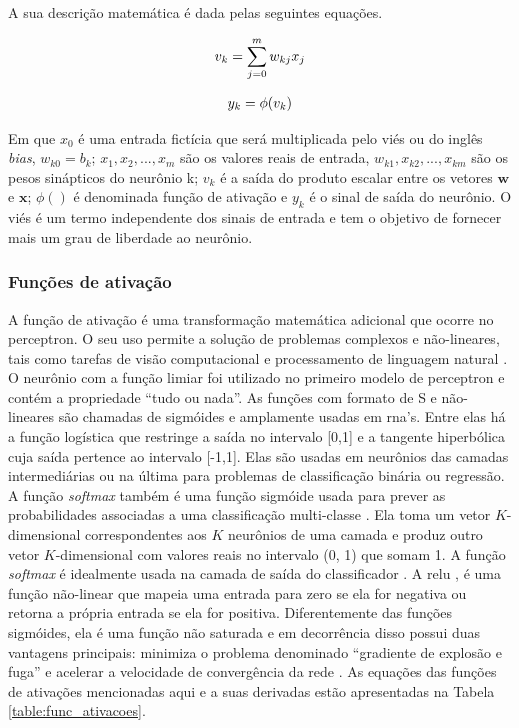 A sua descrição matemática é dada pelas seguintes equações.

\begin{equation}
\begin{aligned}
\centering    
v_{k} = \sum_{j=0}^{m}w_{kj}x_{j} 
\end{aligned}
\end{equation}


\begin{equation}
\begin{aligned}
\centering    
y_{k} = \phi(v_{k})
\end{aligned}
\end{equation}

Em que $x_{0}$ é uma entrada fictícia que será multiplicada pelo viés ou do inglês \textit{bias}, $w_{k0} = b_{k}$; $x_{1},x_{2}, ...,x_{m}$ são os valores reais de entrada, $w_{k1},x_{k2}, ...,x_{km}$ são os pesos sinápticos do neurônio k; $v_{k}$ é a saída do produto escalar entre os vetores $\textbf{w}$ e $ \textbf{x}$;  $\phi()$ é denominada função de ativação e $y_{k}$ é o sinal de saída do neurônio. O viés é um termo independente dos sinais de entrada e tem o objetivo de fornecer mais um grau de liberdade ao neurônio.

\subsubsection{Funções de ativação}
A função de ativação é uma transformação matemática adicional que ocorre no perceptron. O seu uso permite a solução de problemas complexos e não-lineares, tais como tarefas de visão computacional e processamento de linguagem natural \cite{Mitchell}. 
O neurônio com a função limiar foi utilizado no primeiro modelo de perceptron \cite{mcculloch1943logical,Haykin} e contém a propriedade ``tudo ou nada''.  As funções com formato de S e não-lineares são chamadas de sigmóides e amplamente usadas em \acrshort{rna}'s. Entre elas há a função logística que restringe a saída no intervalo [0,1] e a tangente hiperbólica cuja saída pertence ao intervalo [-1,1]. Elas são usadas em neurônios das camadas intermediárias ou na última para problemas de classificação binária ou regressão. 
A função \textit{softmax} também é uma função sigmóide usada para prever as probabilidades associadas a uma classificação multi-classe \cite{Goodfellow2016}.  Ela toma um vetor $K$-dimensional correspondentes aos $K$ neurônios de uma camada e produz outro vetor $K$-dimensional com valores reais no intervalo (0, 1) que somam 1.  A função \textit{softmax} é idealmente usada na camada de saída do classificador \cite{Goodfellow2016}.
A \gls{relu} \cite{nair2010rectified}, é uma função não-linear que mapeia uma entrada para zero se ela for negativa ou retorna a própria entrada se ela for positiva. Diferentemente das funções sigmóides, ela é uma função não saturada e em decorrência disso possui duas vantagens principais: minimiza o problema denominado “gradiente de explosão e fuga” e acelerar a velocidade de convergência da rede \cite{xu2015empirical}.
As equações das funções de ativações mencionadas aqui e a suas derivadas estão apresentadas na Tabela \ref{table:func_ativacoes}. 


